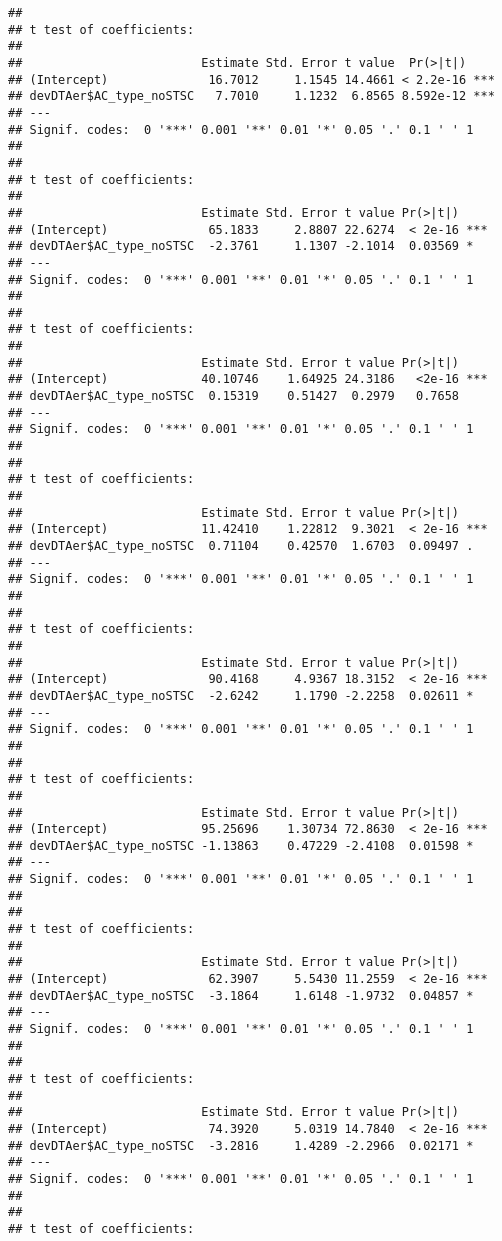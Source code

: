 \documentclass[
]{article}
\begin{document}
\begin{verbatim}
## 
## t test of coefficients:
## 
##                         Estimate Std. Error t value  Pr(>|t|)    
## (Intercept)              16.7012     1.1545 14.4661 < 2.2e-16 ***
## devDTAer$AC_type_noSTSC   7.7010     1.1232  6.8565 8.592e-12 ***
## ---
## Signif. codes:  0 '***' 0.001 '**' 0.01 '*' 0.05 '.' 0.1 ' ' 1
## 
## 
## t test of coefficients:
## 
##                         Estimate Std. Error t value Pr(>|t|)    
## (Intercept)              65.1833     2.8807 22.6274  < 2e-16 ***
## devDTAer$AC_type_noSTSC  -2.3761     1.1307 -2.1014  0.03569 *  
## ---
## Signif. codes:  0 '***' 0.001 '**' 0.01 '*' 0.05 '.' 0.1 ' ' 1
## 
## 
## t test of coefficients:
## 
##                         Estimate Std. Error t value Pr(>|t|)    
## (Intercept)             40.10746    1.64925 24.3186   <2e-16 ***
## devDTAer$AC_type_noSTSC  0.15319    0.51427  0.2979   0.7658    
## ---
## Signif. codes:  0 '***' 0.001 '**' 0.01 '*' 0.05 '.' 0.1 ' ' 1
## 
## 
## t test of coefficients:
## 
##                         Estimate Std. Error t value Pr(>|t|)    
## (Intercept)             11.42410    1.22812  9.3021  < 2e-16 ***
## devDTAer$AC_type_noSTSC  0.71104    0.42570  1.6703  0.09497 .  
## ---
## Signif. codes:  0 '***' 0.001 '**' 0.01 '*' 0.05 '.' 0.1 ' ' 1
## 
## 
## t test of coefficients:
## 
##                         Estimate Std. Error t value Pr(>|t|)    
## (Intercept)              90.4168     4.9367 18.3152  < 2e-16 ***
## devDTAer$AC_type_noSTSC  -2.6242     1.1790 -2.2258  0.02611 *  
## ---
## Signif. codes:  0 '***' 0.001 '**' 0.01 '*' 0.05 '.' 0.1 ' ' 1
## 
## 
## t test of coefficients:
## 
##                         Estimate Std. Error t value Pr(>|t|)    
## (Intercept)             95.25696    1.30734 72.8630  < 2e-16 ***
## devDTAer$AC_type_noSTSC -1.13863    0.47229 -2.4108  0.01598 *  
## ---
## Signif. codes:  0 '***' 0.001 '**' 0.01 '*' 0.05 '.' 0.1 ' ' 1
## 
## 
## t test of coefficients:
## 
##                         Estimate Std. Error t value Pr(>|t|)    
## (Intercept)              62.3907     5.5430 11.2559  < 2e-16 ***
## devDTAer$AC_type_noSTSC  -3.1864     1.6148 -1.9732  0.04857 *  
## ---
## Signif. codes:  0 '***' 0.001 '**' 0.01 '*' 0.05 '.' 0.1 ' ' 1
## 
## 
## t test of coefficients:
## 
##                         Estimate Std. Error t value Pr(>|t|)    
## (Intercept)              74.3920     5.0319 14.7840  < 2e-16 ***
## devDTAer$AC_type_noSTSC  -3.2816     1.4289 -2.2966  0.02171 *  
## ---
## Signif. codes:  0 '***' 0.001 '**' 0.01 '*' 0.05 '.' 0.1 ' ' 1
## 
## 
## t test of coefficients:

\end{verbatim}
\end{document}
